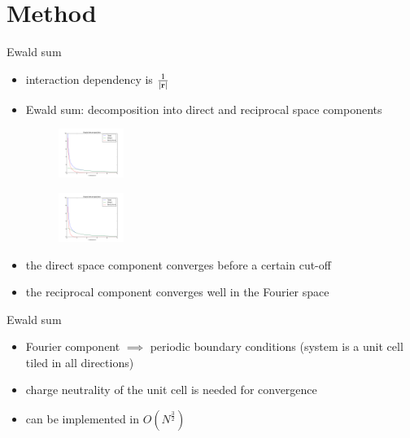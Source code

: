 \documentclass[11pt]{beamer}
\begin{document}
\section{Method}
\begin{frame}{Ewald sum}
\begin{itemize}
\item interaction dependency is $\frac{1}{\lvert \bold{r}\rvert }$
\item Ewald sum: decomposition into direct and reciprocal space components

\FloatBarrier
\begin{figure} 
    \includegraphics[width=0.2\textwidth]{pics/cutoff1.png}
\end{figure}
\begin{figure} 
    \includegraphics[width=0.2\textwidth]{pics/cutoff2.png}
\end{figure}
\FloatBarrier
\item the direct space component converges before a certain cut-off
\item the reciprocal component converges well in the Fourier space
\end{itemize}
\end{frame}

\begin{frame}{Ewald sum}
\begin{itemize}
\item Fourier component $\implies$ periodic boundary conditions (system is a unit cell tiled in all directions)
\item charge neutrality of the unit cell is needed for convergence
\item can be implemented in $O(N^\frac{3}{2})$

\end{itemize}
\end{frame}
\end{document}

